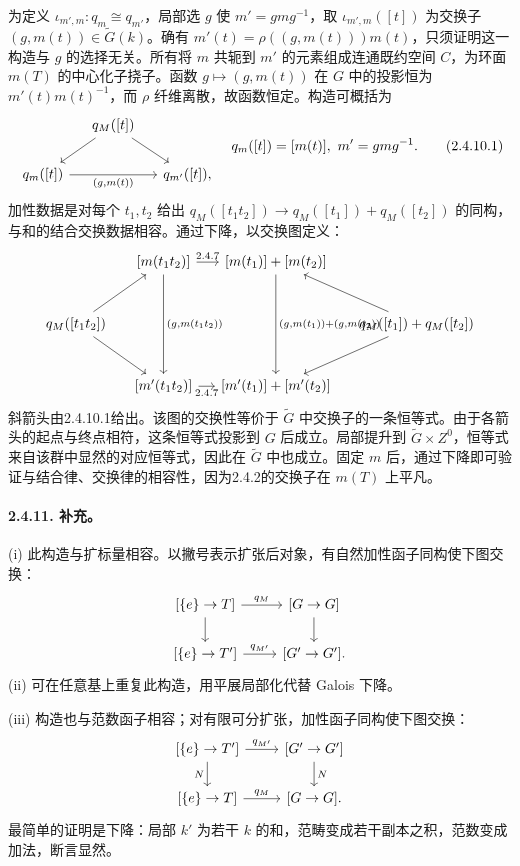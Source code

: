 为定义 $\iota_{m',m}:q_m\cong q_{m'}$，局部选 $g$ 使 $m'=gmg^{-1}$，取 $\iota_{m',m}([t])$ 为交换子 $(g,m(t))\in\widetilde G(k)$。确有 $m'(t)=\rho((g,m(t)))m(t)$，只须证明这一构造与 $g$ 的选择无关。所有将 $m$ 共轭到 $m'$ 的元素组成连通既约空间 $C$，为环面 $m(T)$ 的中心化子挠子。函数 $g\mapsto(g,m(t))$ 在 $G$ 中的投影恒为 $m'(t)m(t)^{-1}$，而 $\rho$ 纤维离散，故函数恒定。构造可概括为
\begin{equation}
 \begin{tikzcd}[column sep=small]
 &q_M([t])\arrow[dl]\arrow[dr]&\\
 q_m([t])\arrow[rr,"{(g,m(t))}"']&&q_{m'}([t]),
 \end{tikzcd}
 \quad q_m([t])=[m(t)],\ m'=gmg^{-1}.
 \tag{2.4.10.1}
\end{equation}
加性数据是对每个 $t_1,t_2$ 给出 $q_M([t_1t_2])\to q_M([t_1])+q_M([t_2])$ 的同构，与和的结合交换数据相容。通过下降，以交换图定义：
\[
 \begin{tikzcd}[column sep=small,row sep=large]
 &{}[m(t_1t_2)]\arrow[r,"2.4.7"]\arrow[dd,"{(g,m(t_1t_2))}"]&{}[m(t_1)]+[m(t_2)]\arrow[dd,"{(g,m(t_1))+(g,m(t_2))}"]&\\
 q_M([t_1t_2])\arrow[ur]\arrow[dr]&&&q_M([t_1])+q_M([t_2])\arrow[ul]\arrow[dl]\\
 &{}[m'(t_1t_2)]\arrow[r,"2.4.7"']&{}[m'(t_1)]+[m'(t_2)]&
 \end{tikzcd}
\]
斜箭头由2.4.10.1给出。该图的交换性等价于 $\widetilde G$ 中交换子的一条恒等式。由于各箭头的起点与终点相符，这条恒等式投影到 $G$ 后成立。局部提升到 $\widetilde G\times Z^0$，恒等式来自该群中显然的对应恒等式，因此在 $\widetilde G$ 中也成立。固定 $m$ 后，通过下降即可验证与结合律、交换律的相容性，因为2.4.2的交换子在 $m(T)$ 上平凡。
\paragraph*{2.4.11. 补充。} (i) 此构造与扩标量相容。以撇号表示扩张后对象，有自然加性函子同构使下图交换：
\[
 \begin{tikzcd}
 {[\{e\}\to T]}\arrow[r,"q_M"]\arrow[d]&{[\widetilde G\to G]}\arrow[d]\\
 {[\{e\}\to T']}\arrow[r,"q_{M'}"]&{[\widetilde G'\to G']}.
 \end{tikzcd}
\]
(ii) 可在任意基上重复此构造，用平展局部化代替 Galois 下降。

(iii) 构造也与范数函子相容；对有限可分扩张，加性函子同构使下图交换：
\[
 \begin{tikzcd}
 {[\{e\}\to T']}\arrow[r,"q_{M'}"]\arrow[d,"N"']&{[\widetilde G'\to G']}\arrow[d,"N"]\\
 {[\{e\}\to T]}\arrow[r,"q_M"]&{[\widetilde G\to G]}.
 \end{tikzcd}
\]
最简单的证明是下降：局部 $k'$ 为若干 $k$ 的和，范畴变成若干副本之积，范数变成加法，断言显然。
